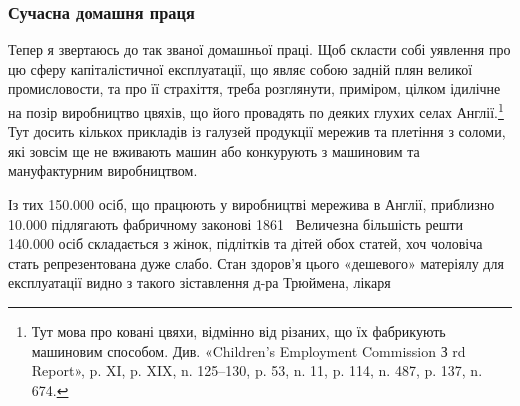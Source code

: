 \subsubsection{Сучасна домашня праця}

Тепер я звертаюсь до так званої домашньої праці. Щоб скласти
собі уявлення про цю сферу капіталістичної експлуатації, що
являє собою задній плян великої промисловости, та про її страхіття,
треба розглянути, приміром, цілком ідилічне на позір виробництво
цвяхів, що його провадять по деяких глухих селах Англії.\footnote{
Тут мова про ковані цвяхи, відмінно від різаних, що їх фабрикують
машиновим способом. Див. «Children’s Employment Commission
З rd Report», p. XI, p. XIX, n. 125--130, p. 53, n. 11, p. 114, n. 487,
p. 137, n. 674.
}
Тут досить кількох прикладів із галузей продукції мережив та
плетіння з соломи, які зовсім ще не вживають машин або конкурують
з машиновим та мануфактурним виробництвом.

Із тих \num{150.000} осіб, що працюють у виробництві мережива в
Англії, приблизно \num{10.000} підлягають фабричному законові 1861~
Величезна більшість решти \num{140.000} осіб складається з жінок,
підлітків та дітей обох статей, хоч чоловіча стать репрезентована
дуже слабо. Стан здоров’я цього «дешевого» матеріялу для експлуатації
видно з такого зіставлення д-ра Трюймена, лікаря
\parbreak{}  %
